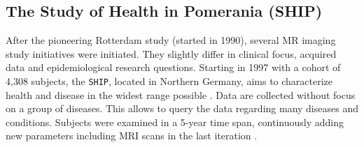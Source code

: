\documentclass[journal]{style/vgtc} 			          %
\newcommand{\rem}[1]{\textcolor{red}{\sout{#1}}}
\begin{document}

\subsection{The Study of Health in Pomerania (SHIP)}
After the pioneering Rotterdam study (started in 1990), several MR imaging study initiatives were initiated.
%
They slightly differ in clinical focus, acquired data and epidemiological research questions.
%
Starting in 1997 with a cohort of 4,308 subjects, the \texttt{SHIP}, located in Northern Germany, aims to characterize health and disease in the widest range possible \cite{Volzke2011}.
%
Data are collected without focus on a group of diseases.
%
This allows to query the data regarding many diseases and conditions.
%
Subjects were examined in a 5-year time span, continuously adding new parameters including MRI scans in the last iteration \cite{Hegenscheid2009}.
%
%

%
\end{document}
